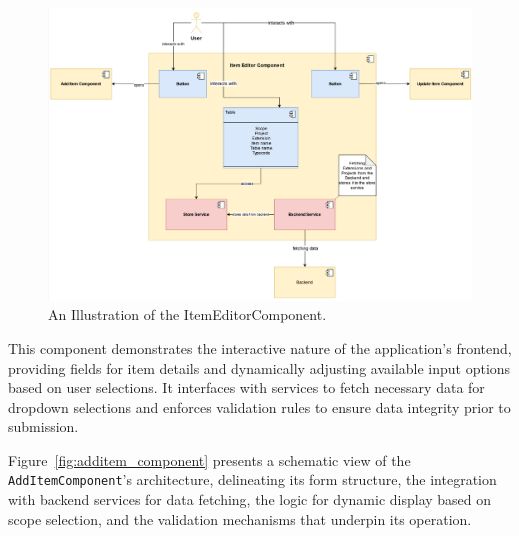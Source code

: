 \begin{figure}[H]
    \centering
    \includegraphics[width=\textwidth]{./images/frontend/item-editor-component}
    \caption{An Illustration of the ItemEditorComponent.}
    \label{fig:itemeditor_component}
\end{figure}


This component demonstrates the interactive nature of the application's frontend, providing fields for item details and dynamically adjusting available input options based on user selections.
It interfaces with services to fetch necessary data for dropdown selections and enforces validation rules to ensure data integrity prior to submission.

Figure~\ref{fig:additem_component} presents a schematic view of the \texttt{AddItemComponent}'s architecture, delineating its form structure, the integration with backend services for data fetching, the logic for dynamic display based on scope selection, and the validation mechanisms that underpin its operation.

